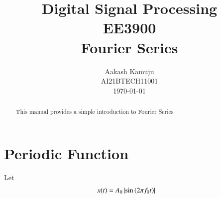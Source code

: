 \documentclass[journal,12pt,twocolumn]{IEEEtran}
\begin{document}
\title{ Digital Signal Processing \\ \Large EE3900 \\ \vspace*{12pt} \textbf{Fourier Series}}
\author{Aakash Kamuju\\ \normalsize AI21BTECH11001 \\ \vspace*{20pt} \normalsize \today}
 \maketitle 
 \tableofcontents
 \begin{abstract}
    This manual provides a simple introduction to Fourier Series
    \end{abstract}
    \section{Periodic Function}
    Let 
    \begin{align}
        x(t) &= A_0\left\vert\sin\left(2\pi f_0 t\right)\right\vert
        \label{eq:x(t)}
    \end{align}
\end{document}
